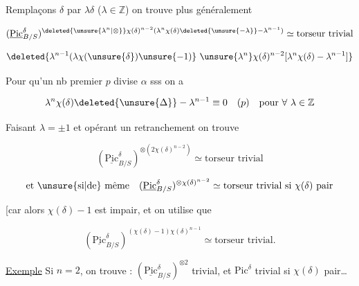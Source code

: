 Remplaçons $\delta$ par $\lambda\delta$ ($\lambda\in\mathbb Z$) on trouve plus généralement

\[
(\underline{\mathrm{Pic}}^\delta_{B/S})^{\deleted{\unsure{\lambda^n|\otimes}}\chi(\delta)^{n-2}(\lambda^{n}\chi(\delta)\deleted{\unsure{-\lambda}}-\lambda^{n-1})}\simeq\text{torseur trivial}
\]

\[
\deleted{\lambda^{n-1}(\lambda\chi(\unsure{\delta})\unsure{-1)}\ \unsure{\lambda^n}\chi(\delta)^{n-2}[\lambda^n\chi(\delta)-\lambda^{n-1}]}
\]

 Pour qu'un nb premier $p$ divise $\alpha$ sss on a

\[
\lambda^n\chi(\delta)\deleted{\unsure{\Delta}}-\lambda^{n-1}\equiv0\quad(p)\quad\text{pour }\forall\ \lambda\in\mathbb Z
\]

Faisant $\lambda=\pm1$ et opérant un retranchement on trouve

\[
(\underline{\mathrm{Pic}}^\delta_{B/S})^{\otimes(2\chi(\delta)^{n-2})}\simeq\text{torseur trivial}
\]

\[
\text{et \unsure{si|de} même}\quad(\underline{\mathrm{Pic}}^\delta_{B/S})^{\otimes\chi(\delta)^{n-2}}\simeq\text{torseur trivial si }\chi(\delta)\text{ pair}
\]

[car alors $\chi(\delta)-1$ est impair, et on utilise que

\[
(\underline{\mathrm{Pic}}^\delta_{B/S})^{(\chi(\delta)-1)\chi(\delta)^{n-1}}\simeq\text{torseur trivial}.
\]

\uline{Exemple} Si $n=2$, on trouve : $(\underline{\mathrm{Pic}}^\delta_{B/S})^{\otimes2}$ trivial, et $\mathrm{Pic}^\delta$ trivial si $\chi(\delta)$ pair\ldots
